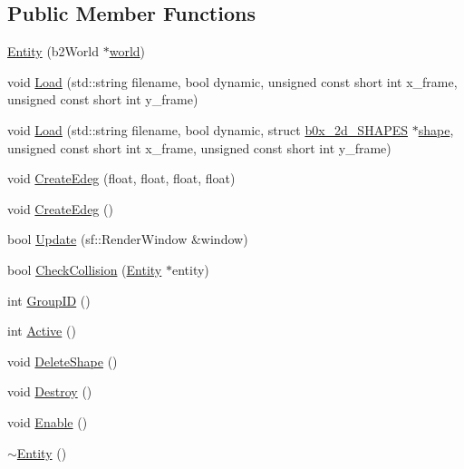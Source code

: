 \subsection*{Public Member Functions}
\begin{DoxyCompactItemize}
\item 
\hyperlink{classSekander_1_1Entity_a2457570ea4a0a1009937a153f8f071f8}{Entity} (b2\+World $\ast$\hyperlink{classSekander_1_1Entity_a6c88c4e735203734409fdd7b1eddca39}{world})
\item 
void \hyperlink{classSekander_1_1Entity_a80ce51e0d09a5ac63eb3c385c47f5d73}{Load} (std\+::string filename, bool dynamic, unsigned const short int x\+\_\+frame, unsigned const short int y\+\_\+frame)
\item 
void \hyperlink{classSekander_1_1Entity_a3381ab7a718fbb980415910f47970468}{Load} (std\+::string filename, bool dynamic, struct \hyperlink{structSekander_1_1b0x__2d__SHAPES}{b0x\+\_\+2d\+\_\+\+S\+H\+A\+P\+ES} $\ast$\hyperlink{classSekander_1_1Entity_a51d32e27f0af3c9f1d68cc27117310ad}{shape}, unsigned const short int x\+\_\+frame, unsigned const short int y\+\_\+frame)
\item 
void \hyperlink{classSekander_1_1Entity_a0f2ae50422b408ef0de2cdcb31f120b4}{Create\+Edeg} (float, float, float, float)
\item 
void \hyperlink{classSekander_1_1Entity_a194f6b6f8a256a3bc0ee73f3eadeb0d0}{Create\+Edeg} ()
\item 
bool \hyperlink{classSekander_1_1Entity_a37320c3ef99e534f80f0306ebdf084ed}{Update} (sf\+::\+Render\+Window \&window)
\item 
bool \hyperlink{classSekander_1_1Entity_a202c7a8db6bcd754ebdd907d4383a6fb}{Check\+Collision} (\hyperlink{classSekander_1_1Entity}{Entity} $\ast$entity)
\item 
int \hyperlink{classSekander_1_1Entity_aaca12636d13d15fe2c84d48c64c43dc4}{Group\+ID} ()
\item 
int \hyperlink{classSekander_1_1Entity_af8b43d3ca6c6740d3e356d98656fa370}{Active} ()
\item 
void \hyperlink{classSekander_1_1Entity_a55dcbd586dfa0b339d5116ff14d58cbd}{Delete\+Shape} ()
\item 
void \hyperlink{classSekander_1_1Entity_a85095c868a53dffcb7d1f9c080448c7f}{Destroy} ()
\item 
void \hyperlink{classSekander_1_1Entity_a084a9bfb47b0efd2c5098e5f97b51c79}{Enable} ()
\item 
\hyperlink{classSekander_1_1Entity_a2246c81f180544956e614c786b7a2427}{$\sim$\+Entity} ()
\end{DoxyCompactItemize}
